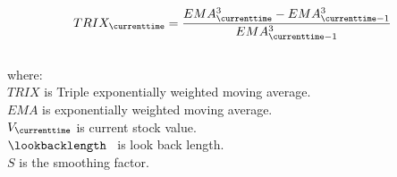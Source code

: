 \documentclass{article}
\begin{document}
\begin{equation}
    TRIX_{\currenttime} = \frac{EMA_{\currenttime}^{3} - EMA_{\currenttime-1}^{3}}{EMA_{\currenttime-1}^{3}}
\end{equation}
\\

where: \\

$TRIX$ is Triple exponentially weighted moving average. \\

$EMA$ is exponentially weighted moving average. \\

$V_{\currenttime}$ is current stock value. \\

$\lookbacklength$ \ is look back length. \\

$S$ is the smoothing factor.

\hspace{200mm}
\hspace{200mm}
\keyterms
\furtherlinks
\end{document}
